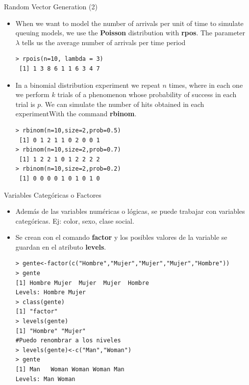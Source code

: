 \documentclass[handout]{beamer}
\begin{document}
\begin{frame}[fragile]{Random Vector Generation (2)}
\scriptsize{
\begin{itemize}
 \item When we want to model the number of arrivals per unit of time to simulate queuing models, we use the \textbf{Poisson} distribution with \textbf{rpos}. The parameter $\lambda$ tells us the average number of arrivals per time period
 \begin{verbatim}
> rpois(n=10, lambda = 3)
 [1] 1 3 8 6 1 1 6 3 4 7
 \end{verbatim}

 \item In a binomial distribution experiment we repeat $n$ times, where in each one we perform $k$ trials of a phenomenon whose probability of success in each trial is $p$.  We can simulate the number of hits obtained in each experimentWith the command \textbf{rbinom}.
\begin{verbatim}
> rbinom(n=10,size=2,prob=0.5)
 [1] 0 1 2 1 1 0 2 0 0 1
> rbinom(n=10,size=2,prob=0.7)
 [1] 1 2 2 1 0 1 2 2 2 2
> rbinom(n=10,size=2,prob=0.2)
 [1] 0 0 0 0 1 0 1 0 1 0 
\end{verbatim}

 
 
\end{itemize}


}
\end{frame}


\begin{frame}[fragile]{Variables Categóricas o Factores}
\scriptsize{
\begin{itemize}
 \item Además de las variables numéricas o lógicas, se puede trabajar con variables categóricas. Ej: color, sexo, clase social.
 \item Se crean con el comando \textbf{factor} y los posibles valores de la variable se guardan en el atributo \textbf{levels}.
\begin{verbatim}
> gente<-factor(c("Hombre","Mujer","Mujer","Mujer","Hombre"))
> gente
[1] Hombre Mujer  Mujer  Mujer  Hombre
Levels: Hombre Mujer
> class(gente)
[1] "factor"
> levels(gente)
[1] "Hombre" "Mujer" 
#Puedo renombrar a los niveles
> levels(gente)<-c("Man","Woman")
> gente
[1] Man   Woman Woman Woman Man  
Levels: Man Woman
\end{verbatim}
 
\end{itemize}

}
\end{frame}
\end{document}
